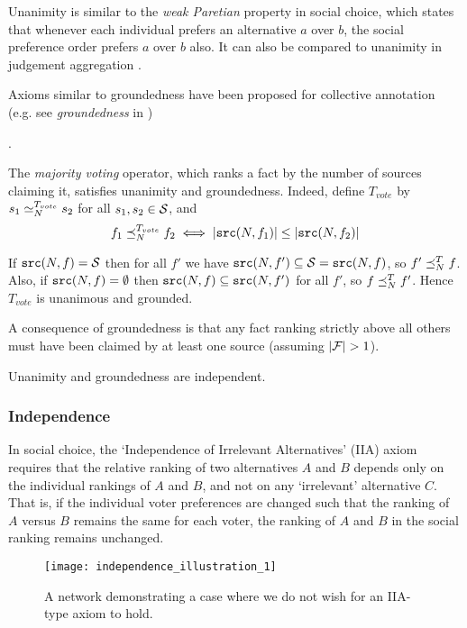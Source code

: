 \documentclass[../main.tex]{subfiles}
\begin{document}
Unanimity is similar to the \emph{weak Paretian} property \cite{handbook_intro}
in social choice, which states that whenever each individual prefers an
alternative $a$ over $b$, the social preference order prefers $a$ over $b$
also. It can also be compared to unanimity in judgement
aggregation \cite{handbook_ja}.

Axioms similar to groundedness have been proposed for collective annotation
(e.g. see \emph{groundedness} in \cite{kruger})

.

\begin{example}
The \emph{majority voting} operator, which ranks a fact by the number of
sources claiming it, satisfies unanimity and groundedness. Indeed, define
$T_{vote}$ by $s_1 \seq_N^{T_{vote}} s_2$ for all $s_1, s_2 \in \S$, and
    $$ f_1 \fle_N^{T_{vote}} f_2 \iff |\src(N, f_1)| \le |\src(N, f_2)| $$

If $\src(N, f) = \S$ then for all $f'$ we have $\src(N, f') \subseteq \S =
\src(N, f)$, so $f' \fle_N^T f$. Also, if $\src(N, f) = \emptyset$ then
$\src(N, f) \subseteq \src(N, f')$ for all $f'$, so $f \fle_N^T f'$. Hence
$T_{vote}$ is unanimous and grounded.
\end{example}

A consequence of groundedness is that any fact ranking strictly above all
others must have been claimed by at least one source (assuming $|\F|>1$).

\begin{proposition}
\label{prop:unam_ground_indep}
Unanimity and groundedness are independent.
\end{proposition}

\subsubsection{Independence}

In social choice, the `Independence of Irrelevant Alternatives' (IIA) axiom
\cite{arrow} requires that the relative ranking of two alternatives $A$ and $B$
depends only on the individual rankings of $A$ and $B$, and not on any
`irrelevant' alternative $C$. That is, if the individual voter preferences are
changed such that the ranking of $A$ versus $B$ remains the same for each
voter, the ranking of $A$ and $B$ in the social ranking remains unchanged.

\begin{figure}
    \centering
    \texttt{[image: independence\_illustration\_1]}
    \caption{
        A network demonstrating a case where we do not wish for an IIA-type
        axiom to hold.
    }
    \label{img:independence_illustration_1}
\end{figure}
\end{document}
